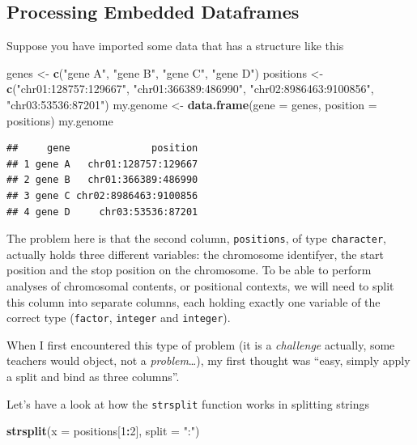 \documentclass[]{book}
\newenvironment{Shaded}{\begin{snugshade}}{\end{snugshade}}
\newcommand{\DataTypeTok}[1]{\textcolor[rgb]{0.13,0.29,0.53}{#1}}
\newcommand{\DecValTok}[1]{\textcolor[rgb]{0.00,0.00,0.81}{#1}}
\newcommand{\KeywordTok}[1]{\textcolor[rgb]{0.13,0.29,0.53}{\textbf{#1}}}
\newcommand{\NormalTok}[1]{#1}
\newcommand{\OperatorTok}[1]{\textcolor[rgb]{0.81,0.36,0.00}{\textbf{#1}}}
\newcommand{\StringTok}[1]{\textcolor[rgb]{0.31,0.60,0.02}{#1}}
\begin{document}
\hypertarget{embeddeddf}{%
\subsection{Processing Embedded Dataframes}\label{embeddeddf}}

Suppose you have imported some data that has a structure like this

\begin{Shaded}
\begin{Highlighting}[]
\NormalTok{genes <-}\StringTok{ }\KeywordTok{c}\NormalTok{(}\StringTok{"gene A"}\NormalTok{, }\StringTok{"gene B"}\NormalTok{, }\StringTok{"gene C"}\NormalTok{, }\StringTok{"gene D"}\NormalTok{)}
\NormalTok{positions <-}\StringTok{ }\KeywordTok{c}\NormalTok{(}\StringTok{"chr01:128757:129667"}\NormalTok{, }
               \StringTok{"chr01:366389:486990"}\NormalTok{,}
               \StringTok{"chr02:8986463:9100856"}\NormalTok{,}
               \StringTok{"chr03:53536:87201"}\NormalTok{)}
\NormalTok{my.genome <-}\StringTok{ }\KeywordTok{data.frame}\NormalTok{(}\DataTypeTok{gene =}\NormalTok{ genes, }\DataTypeTok{position =}\NormalTok{ positions)}
\NormalTok{my.genome}
\end{Highlighting}
\end{Shaded}

\begin{verbatim}
##     gene              position
## 1 gene A   chr01:128757:129667
## 2 gene B   chr01:366389:486990
## 3 gene C chr02:8986463:9100856
## 4 gene D     chr03:53536:87201
\end{verbatim}

The problem here is that the second column, \texttt{positions}, of type \texttt{character}, actually holds three different variables: the chromosome identifyer, the start position and the stop position on the chromosome. To be able to perform analyses of chromosomal contents, or positional contexts, we will need to split this column into separate columns, each holding exactly one variable of the correct type (\texttt{factor}, \texttt{integer} and \texttt{integer}).

When I first encountered this type of problem (it is a \emph{challenge} actually, some teachers would object, not a \emph{problem}\ldots{}), my first thought was ``easy, simply apply a split and bind as three columns''.

Let's have a look at how the \texttt{strsplit} function works in splitting strings

\begin{Shaded}
\begin{Highlighting}[]
\KeywordTok{strsplit}\NormalTok{(}\DataTypeTok{x =}\NormalTok{ positions[}\DecValTok{1}\OperatorTok{:}\DecValTok{2}\NormalTok{], }\DataTypeTok{split =} \StringTok{":"}\NormalTok{)}
\end{Highlighting}
\end{Shaded}
\end{document}
